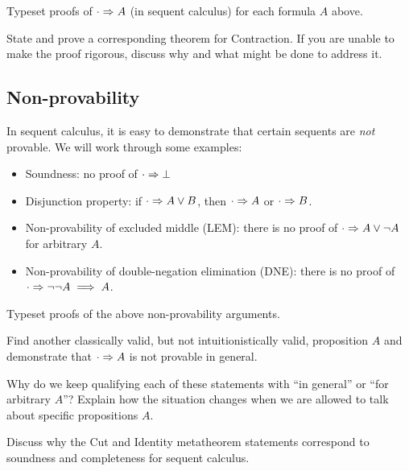\documentclass{article}
\begin{document}
\begin{exercise}
  Typeset proofs of $\cdot \Rightarrow A$ (in sequent calculus)
  for each formula $A$ above.
\end{exercise}


\begin{exercise} 
  State and prove a corresponding theorem for Contraction.
  If you are unable to make the proof rigorous,
  discuss why and what might be done to address it.
\end{exercise}

\subsection{Non-provability}

In sequent calculus, it is easy to demonstrate
that certain sequents are {\em not} provable.
We will work through some examples:

\begin{itemize}
  \item Soundness: no proof of $\cdot \Rightarrow \bot$
  \item Disjunction property: if $\cdot \Rightarrow A \vee B$,
    then $\cdot \Rightarrow A$ or $\cdot \Rightarrow B$.
  \item Non-provability of excluded middle (LEM): there is no proof
    of $\cdot \Rightarrow A \vee \lnot A$ for arbitrary $A$.
  \item Non-provability of double-negation elimination (DNE):
    there is no proof of $\cdot \Rightarrow \lnot \lnot A \implies A$.
\end{itemize}

\begin{exercise}
  Typeset proofs of the above non-provability arguments.
\end{exercise}

\begin{exercise}
  Find another classically valid, but not intuitionistically valid,
  proposition $A$ and demonstrate that $\cdot \Rightarrow A$ is not provable
  in general.
\end{exercise}

\begin{exercise}
  Why do we keep qualifying each of these statements with ``in general''
  or ``for arbitrary $A$''? Explain how the situation changes
  when we are allowed to talk about specific propositions $A$.
\end{exercise}


\begin{exercise}
  Discuss why the Cut and Identity metatheorem statements correspond to soundness and
  completeness for sequent calculus.
\end{exercise}
\end{document}
